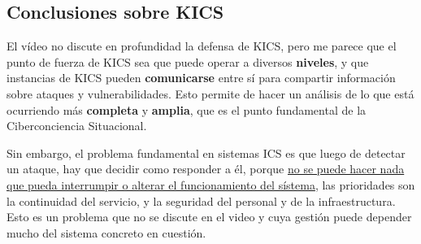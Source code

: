 
\subsection{Conclusiones sobre \textsc{KICS}}
El vídeo no discute en profundidad la defensa de \textsc{KICS}, pero me parece que el punto de fuerza de \textsc{KICS} sea que puede operar a diversos \textbf{niveles}, y que instancias de \textsc{KICS} pueden \textbf{comunicarse} entre sí para compartir información sobre ataques y vulnerabilidades.
Esto permite de hacer un análisis de lo que está ocurriendo más \textbf{completa} y \textbf{amplia}, que es el punto fundamental de la Ciberconciencia Situacional.

Sin embargo, el problema fundamental en sistemas ICS es que luego de detectar un ataque, hay que decidir como responder a él, porque \ul{no se puede hacer nada que pueda interrumpir o alterar el funcionamiento del sístema}, las prioridades son la continuidad del servicio, y la seguridad del personal y de la infraestructura.\\
Esto es un problema que no se discute en el video y cuya gestión puede depender mucho del sistema concreto en cuestión.